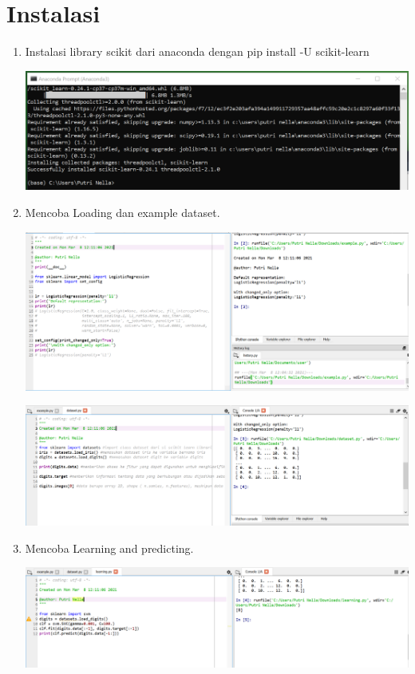 \section{Instalasi}
\begin{enumerate}
    \item Instalasi library scikit dari anaconda dengan pip install -U scikit-learn
     \begin{center}
    \includegraphics[width=.8\textwidth]{figures/1184017/chapter1/1.PNG}
    \end{center}
    \item Mencoba Loading dan example dataset.
    \begin{center}
    \includegraphics[width=.8\textwidth]{figures/1184017/chapter1/2.PNG}
    \end{center}
     \begin{center}
    \includegraphics[width=.8\textwidth]{figures/1184017/chapter1/3.PNG}
    \end{center}
    \item Mencoba Learning and predicting.
    \begin{center}
    \includegraphics[width=.8\textwidth]{figures/1184017/chapter1/4.PNG}

\end{center}
\end{enumerate}
